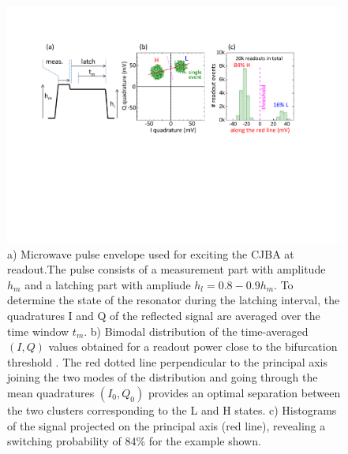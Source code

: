 \begin{figure}[ht!]
\centering
\includegraphics[width=\textwidth]{./material/figures/measurement/readout}
\caption[]{a) Microwave pulse envelope used for exciting the CJBA at readout.The pulse consists of a measurement part with amplitude $h_m$ and a latching part with ampliude $h_l=0.8-0.9h_m$. To determine the state of the resonator during the latching interval, the quadratures I and Q of the reflected signal are averaged over the time window $t_m$. b) Bimodal distribution of the time-averaged $(I,Q)$ values obtained for a readout power close to the bifurcation threshold . The red dotted line perpendicular to the principal axis joining the two modes of the distribution and going through the mean quadratures $(I_0,Q_0)$ provides an optimal separation between the two clusters corresponding to the L and H states. c) Histograms of the signal projected on the principal axis (red line), revealing a switching probability of 84\% for the  example shown.}
\label{fig:readout_bringup}
\end{figure}



